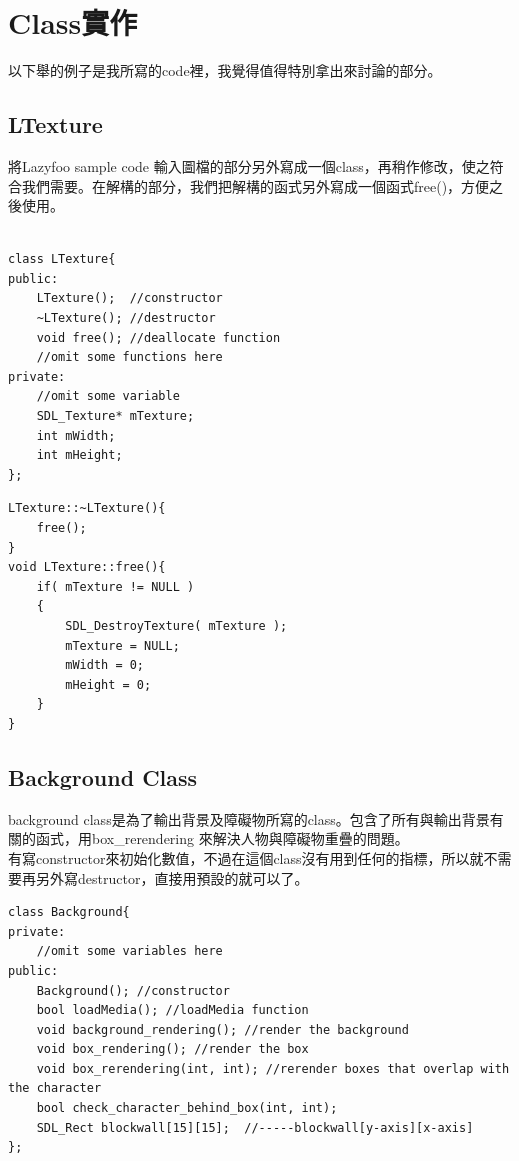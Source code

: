 \documentclass[a4paper]{article}
\theoremstyle{mystyle}	%
\begin{document}
\section{Class實作}
以下舉的例子是我所寫的code裡，我覺得值得特別拿出來討論的部分。
\subsection{LTexture}
將Lazyfoo sample code 輸入圖檔的部分另外寫成一個class，再稍作修改，使之符合我們需要。在解構的部分，我們把解構的函式另外寫成一個函式{\codefont \small free()}，方便之後使用。\\\\
\begin{codefont}
\begin{minipage}[c]{0.49\textwidth}
\begin{lstlisting}[xleftmargin=0.08\textwidth, caption={LTexture.hpp 18-49}]
class LTexture{
public:
    LTexture();  //constructor
    ~LTexture(); //destructor
    void free(); //deallocate function
    //omit some functions here
private:
    //omit some variable
    SDL_Texture* mTexture;
    int mWidth;
    int mHeight;
};

\end{lstlisting}
\end{minipage}%
\hfill
\begin{minipage}[c]{0.49\textwidth}
\begin{lstlisting}[xleftmargin=0.08\textwidth, caption={LTexture.cpp 23-27,71-81}]
LTexture::~LTexture(){
    free();
}
void LTexture::free(){
    if( mTexture != NULL )
    {
        SDL_DestroyTexture( mTexture );
        mTexture = NULL;
        mWidth = 0;
        mHeight = 0;
    }
}
\end{lstlisting}
\end{minipage}
\end{codefont}
\subsection{Background Class}
background class是為了輸出背景及障礙物所寫的class。包含了所有與輸出背景有關的函式，用{\codefont \small box\_rerendering }來解決人物與障礙物重疊的問題。\\
有寫constructor來初始化數值，不過在這個class沒有用到任何的指標，所以就不需要再另外寫destructor，直接用預設的就可以了。\\
\begin{codefont}
\begin{lstlisting}[caption={background.hpp 18-34}]
class Background{
private:
	//omit some variables here
public:
    Background(); //constructor
    bool loadMedia(); //loadMedia function
    void background_rendering(); //render the background
    void box_rendering(); //render the box
    void box_rerendering(int, int); //rerender boxes that overlap with the character
    bool check_character_behind_box(int, int);
    SDL_Rect blockwall[15][15];  //-----blockwall[y-axis][x-axis]
};
\end{lstlisting}
\end{codefont}
\end{document}
